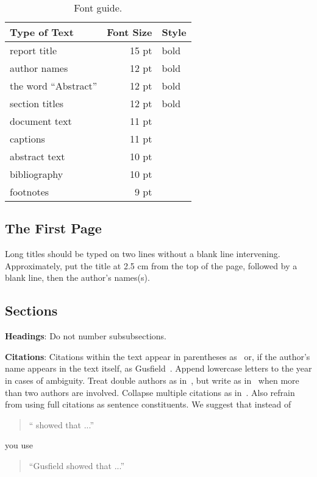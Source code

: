\documentclass[11pt]{article}
\begin{document}
	\begin{table}[h]
		\begin{center}
			\begin{tabular}{|l|rl|}
				\hline \bf Type of Text & \bf Font Size & \bf Style \\ \hline
				report title & 15 pt & bold \\
				author names & 12 pt & bold \\
				the word ``Abstract'' & 12 pt & bold \\
				section titles & 12 pt & bold \\
				document text & 11 pt  &\\
				captions & 11 pt & \\
				abstract text & 10 pt & \\
				bibliography & 10 pt & \\
				footnotes & 9 pt & \\
				\hline
			\end{tabular}
		\end{center}
		\caption{\label{font-table} Font guide.}
	\end{table}
	
	\subsection{The First Page}
	\label{ssec:first}
	Long titles should be typed on two lines
	without a blank line intervening. Approximately, put the title at 2.5
	cm from the top of the page, followed by a blank line, then the
	author's names(s).
	
	\subsection{Sections}
	
	{\bf Headings}: Do not number subsubsections.
	
	{\bf Citations}: Citations within the text appear in parentheses
	as~\cite{Gusfield:97} or, if the author's name appears in the text
	itself, as Gusfield~.  Append lowercase letters
	to the year in cases of ambiguity.  Treat double authors as
	in~\cite{Aho:72}, but write as in~\cite{Chandra:81} when more than two
	authors are involved. Collapse multiple citations as
	in~\cite{Gusfield:97,Aho:72}. Also refrain from using full citations
	as sentence constituents. We suggest that instead of
	\begin{quote}
		``\cite{Gusfield:97} showed that ...''
	\end{quote}
	you use
	\begin{quote}
		``Gusfield    showed that ...''
	\end{quote}
	
\end{document}
